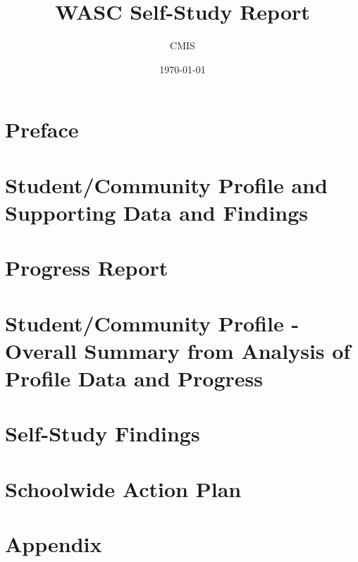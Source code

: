 \documentclass{report}
\title{WASC Self-Study Report}
\date{\today}
\author{CMIS}
\begin{document}
\maketitle

\tableofcontents
\chapter{Preface}

\chapter[Student/Community Profile Data]{Student/Community Profile and Supporting Data and Findings}

\chapter{Progress Report}

\chapter[Student/Community Profile Summary]{Student/Community Profile - Overall Summary from Analysis of Profile Data and Progress}

\chapter{Self-Study Findings}









\chapter{Schoolwide Action Plan}

\chapter{Appendix}
\listoffigures
\listoftables
\end{document}
